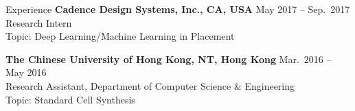 
\begin{rSection}{Experience}
{\bf Cadence Design Systems, Inc., CA, USA}               \hfill { May 2017 -- Sep.~2017} \\
Research Intern \\
Topic: Deep Learning/Machine Learning in Placement

{\bf The Chinese University of Hong Kong, NT, Hong Kong}  \hfill { Mar.~2016 -- May 2016} \\ 
Research Assistant, Department of Computer Science \& Engineering \\
Topic: Standard Cell Synthesis




\end{rSection}


